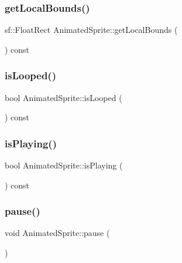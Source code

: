 \subsubsection{\texorpdfstring{get\+Local\+Bounds()}{getLocalBounds()}}
{\footnotesize\ttfamily sf\+::\+Float\+Rect Animated\+Sprite\+::get\+Local\+Bounds (\begin{DoxyParamCaption}{ }\end{DoxyParamCaption}) const}

\mbox{\label{class_animated_sprite_aaf2c2fb0e1487e689af4a6bbeb7e3e85}} 
\subsubsection{\texorpdfstring{is\+Looped()}{isLooped()}}
{\footnotesize\ttfamily bool Animated\+Sprite\+::is\+Looped (\begin{DoxyParamCaption}{ }\end{DoxyParamCaption}) const}

\mbox{\label{class_animated_sprite_a55f450add05d45e5369a6ad24f9e438f}} 
\subsubsection{\texorpdfstring{is\+Playing()}{isPlaying()}}
{\footnotesize\ttfamily bool Animated\+Sprite\+::is\+Playing (\begin{DoxyParamCaption}{ }\end{DoxyParamCaption}) const}

\mbox{\label{class_animated_sprite_a48384db59427423b5c1d98f6ee94fe45}} 
\subsubsection{\texorpdfstring{pause()}{pause()}}
{\footnotesize\ttfamily void Animated\+Sprite\+::pause (\begin{DoxyParamCaption}{ }\end{DoxyParamCaption})}

